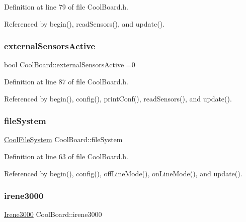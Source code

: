 Definition at line 79 of file Cool\+Board.\+h.



Referenced by begin(), read\+Sensors(), and update().

\mbox{\label{classCoolBoard_a638b00b76aeb819ecfd4c10b8cdd7bb7}} 
\subsubsection{\texorpdfstring{external\+Sensors\+Active}{externalSensorsActive}}
{\footnotesize\ttfamily bool Cool\+Board\+::external\+Sensors\+Active =0\hspace{0.3cm}{\ttfamily [private]}}



Definition at line 87 of file Cool\+Board.\+h.



Referenced by begin(), config(), print\+Conf(), read\+Sensors(), and update().

\mbox{\label{classCoolBoard_a42c2586fbb13ff7f06538e9284e8538d}} 
\subsubsection{\texorpdfstring{file\+System}{fileSystem}}
{\footnotesize\ttfamily \hyperlink{classCoolFileSystem}{Cool\+File\+System} Cool\+Board\+::file\+System\hspace{0.3cm}{\ttfamily [private]}}



Definition at line 63 of file Cool\+Board.\+h.



Referenced by begin(), config(), off\+Line\+Mode(), on\+Line\+Mode(), and update().

\mbox{\label{classCoolBoard_ad103718ce316006c4695b8eb312eaf11}} 
\subsubsection{\texorpdfstring{irene3000}{irene3000}}
{\footnotesize\ttfamily \hyperlink{classIrene3000}{Irene3000} Cool\+Board\+::irene3000\hspace{0.3cm}{\ttfamily [private]}}



